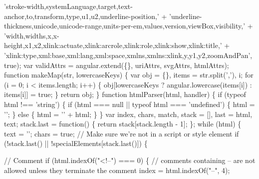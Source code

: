 \begin{DoxyCodeInclude}
\textcolor{stringliteral}{    '}stroke-width,systemLanguage,target,text-anchor,to,transform,type,u1,u2,underline-position,\textcolor{stringliteral}{' +}
\textcolor{stringliteral}{    '}underline-thickness,unicode,unicode-range,units-per-em,values,version,viewBox,visibility,\textcolor{stringliteral}{' +}
\textcolor{stringliteral}{    '}width,widths,x,x-height,x1,x2,xlink:actuate,xlink:arcrole,xlink:role,xlink:show,xlink:title,\textcolor{stringliteral}{' +}
\textcolor{stringliteral}{    '}xlink:type,xml:base,xml:lang,xml:space,xmlns,xmlns:xlink,y,y1,y2,zoomAndPan\textcolor{stringliteral}{', true);}
\textcolor{stringliteral}{}
\textcolor{stringliteral}{var validAttrs = angular.extend(\{\},}
\textcolor{stringliteral}{                                uriAttrs,}
\textcolor{stringliteral}{                                svgAttrs,}
\textcolor{stringliteral}{                                htmlAttrs);}
\textcolor{stringliteral}{}
\textcolor{stringliteral}{function makeMap(str, lowercaseKeys) \{}
\textcolor{stringliteral}{  var obj = \{\}, items = str.split('},\textcolor{stringliteral}{'), i;}
\textcolor{stringliteral}{  for (i = 0; i < items.length; i++) \{}
\textcolor{stringliteral}{    obj[lowercaseKeys ? angular.lowercase(items[i]) : items[i]] = true;}
\textcolor{stringliteral}{  \}}
\textcolor{stringliteral}{  return obj;}
\textcolor{stringliteral}{\}}
\textcolor{stringliteral}{}
\textcolor{stringliteral}{}
\textcolor{stringliteral}{function htmlParser(html, handler) \{}
\textcolor{stringliteral}{  if (typeof html !== '}\textcolor{keywordtype}{string}\textcolor{stringliteral}{') \{}
\textcolor{stringliteral}{    if (html === null || typeof html === '}undefined\textcolor{stringliteral}{') \{}
\textcolor{stringliteral}{      html = '}\textcolor{stringliteral}{';}
\textcolor{stringliteral}{    \} else \{}
\textcolor{stringliteral}{      html = '}\textcolor{stringliteral}{' + html;}
\textcolor{stringliteral}{    \}}
\textcolor{stringliteral}{  \}}
\textcolor{stringliteral}{  var index, chars, match, stack = [], last = html, text;}
\textcolor{stringliteral}{  stack.last = function() \{ return stack[stack.length - 1]; \};}
\textcolor{stringliteral}{}
\textcolor{stringliteral}{  while (html) \{}
\textcolor{stringliteral}{    text = '}\textcolor{stringliteral}{';}
\textcolor{stringliteral}{    chars = true;}
\textcolor{stringliteral}{}
\textcolor{stringliteral}{    // Make sure we'}re not in a script or style element
    \textcolor{keywordflow}{if} (!stack.last() || !specialElements[stack.last()]) \{

      \textcolor{comment}{// Comment}
      \textcolor{keywordflow}{if} (html.indexOf(\textcolor{stringliteral}{"<!--"}) === 0) \{
        \textcolor{comment}{// comments containing -- are not allowed unless they terminate the comment}
        index = html.indexOf(\textcolor{stringliteral}{"--"}, 4);


\end{DoxyCodeInclude}
